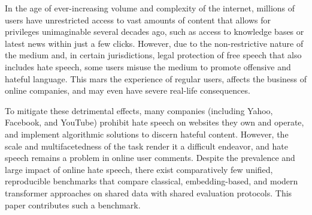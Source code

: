 \documentclass[11pt]{article}
\begin{document}
In the age of ever-increasing volume and complexity of the internet, millions
of users have unrestricted access to vast amounts of content that allows for
privileges unimaginable several decades ago, such as access to knowledge
bases or latest news within just a few clicks. However, due to the
non-restrictive nature of the medium and, in certain jurisdictions, legal
protection of free speech that also includes hate speech, some users misuse
the medium to promote offensive and hateful language. This mars the
experience of regular users, affects the business of online companies, and
may even have severe real-life consequences.

To mitigate these detrimental effects, many companies (including Yahoo,
Facebook, and YouTube) prohibit hate speech on websites they own and operate,
and implement algorithmic solutions to discern hateful content. However, the
scale and multifacetedness of the task render it a difficult endeavor, and
hate speech remains a problem in online user comments. Despite the prevalence
and large impact of online hate speech, there exist comparatively few
unified, reproducible benchmarks that compare classical, embedding-based, and
modern transformer approaches on shared data with shared evaluation
protocols. This paper contributes such a benchmark.
\end{document}
